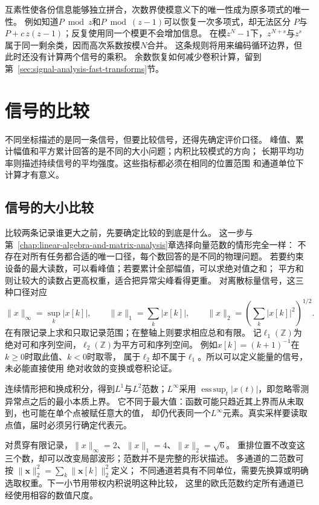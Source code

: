 互素性使各份信息能够独立拼合，次数界使模意义下的唯一性成为原多项式的唯一性。
例如知道$P\bmod z$和$P\bmod(z-1)$可以恢复一次多项式，却无法区分
$P$与$P+c\,z(z-1)$；反复使用同一个模更不会增加信息。
在模$z^N-1$下，$z^{N+s}$与$z^s$属于同一剩余类，因而高次系数按模$N$合并。
这条规则将用来编码循环边界，但此时还没有计算两个信号的乘积。
余数恢复如何减少卷积计算，留到第~\ref{sec:signal-analysis-fast-transforms}节。

\section{信号的比较}
\label{sec:signal-comparison}

不同坐标描述的是同一条信号，但要比较信号，还得先确定评价口径。
峰值、累计幅值和平方累计回答的是不同的大小问题；内积比较模式的方向；
长期平均功率则描述持续信号的平均强度。这些指标都必须在相同的位置范围
和通道单位下计算才有意义。

\subsection{信号的大小比较}

比较两条记录谁更大之前，先要确定比较的到底是什么。
这一步与第~\ref{chap:linear-algebra-and-matrix-analysis}章选择向量范数的情形完全一样：
不存在对所有任务都合适的唯一口径，每个数回答的是不同的物理问题。
若要约束设备的最大读数，可以看峰值；若要累计全部幅值，可以求绝对值之和；
平方和则让较大的读数占更高权重，适合把异常尖峰看得更重。
对离散标量信号，这三种口径对应
\[
  \|x\|_\infty=\sup_k|x[k]|,\qquad
  \|x\|_1=\sum_k|x[k]|,\qquad
  \|x\|_2=\left(\sum_k|x[k]|^2\right)^{1/2}.
\]
在有限记录上求和只取记录范围；在整轴上则要求相应总和有限。
记$\ell_1(\mathbb Z)$为绝对可和序列空间，$\ell_2(\mathbb Z)$为平方可和序列空间。
例如$x[k]=(k+1)^{-1}$在$k\geq0$时取此值、$k<0$时取零，
属于$\ell_2$却不属于$\ell_1$。所以可以定义能量的信号，未必能直接使用
绝对收敛的变换或卷积论证。

连续情形把和换成积分，得到$L^1$与$L^2$范数；$L^\infty$采用
$\operatorname*{ess\,sup}_t|x(t)|$，即忽略零测异常点之后的最小本质上界。
它不同于最大值：函数可能只趋近其上界而从未取到，也可能在单个点被赋任意大的值，
却仍代表同一个$L^\infty$元素。真实采样要读取点值，届时必须另行确定代表元。

对贯穿有限记录，$\|x\|_\infty=2$、$\|x\|_1=4$、$\|x\|_2=\sqrt6$。
重排位置不改变这三个数，却可以改变局部波形；范数并不是完整的形状描述。
多通道的二范数可按
$\|\bm x\|_2^2=\sum_k\|\bm x[k]\|_2^2$定义；
不同通道若具有不同单位，需要先换算或明确选取权重。下一小节用带权内积说明这种比较，
这里的欧氏范数约定所有通道已经使用相容的数值尺度。

